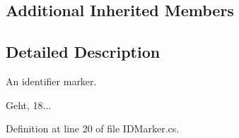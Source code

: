 \subsection*{Additional Inherited Members}


\subsection{Detailed Description}
An identifier marker. 

Geht, 18... 

Definition at line 20 of file I\-D\-Marker.\-cs.

